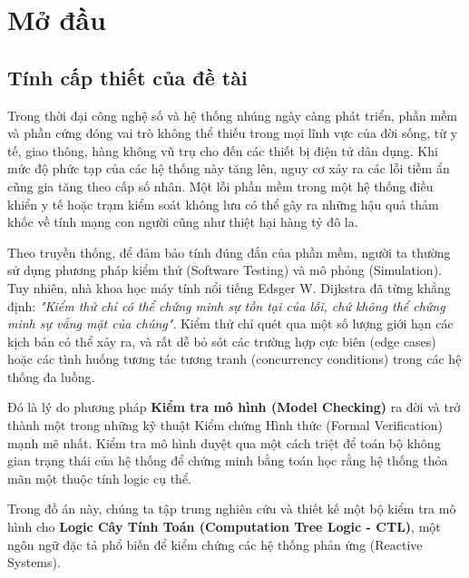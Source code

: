\documentclass[12pt,a4paper]{article}
\begin{document}

\newpage
\tableofcontents
\newpage
\listoffigures
\newpage
\listoftables
\newpage

\section{Mở đầu}
\subsection{Tính cấp thiết của đề tài}
Trong thời đại công nghệ số và hệ thống nhúng ngày càng phát triển, phần mềm và phần cứng đóng vai trò không thể thiếu trong mọi lĩnh vực của đời sống, từ y tế, giao thông, hàng không vũ trụ cho đến các thiết bị điện tử dân dụng. Khi mức độ phức tạp của các hệ thống này tăng lên, nguy cơ xảy ra các lỗi tiềm ẩn cũng gia tăng theo cấp số nhân. Một lỗi phần mềm trong một hệ thống điều khiển y tế hoặc trạm kiểm soát không lưu có thể gây ra những hậu quả thảm khốc về tính mạng con người cũng như thiệt hại hàng tỷ đô la.

Theo truyền thống, để đảm bảo tính đúng đắn của phần mềm, người ta thường sử dụng phương pháp kiểm thử (Software Testing) và mô phỏng (Simulation). Tuy nhiên, nhà khoa học máy tính nổi tiếng Edsger W. Dijkstra đã từng khẳng định: \textit{"Kiểm thử chỉ có thể chứng minh sự tồn tại của lỗi, chứ không thể chứng minh sự vắng mặt của chúng"}. Kiểm thử chỉ quét qua một số lượng giới hạn các kịch bản có thể xảy ra, và rất dễ bỏ sót các trường hợp cực biên (edge cases) hoặc các tình huống tương tác tương tranh (concurrency conditions) trong các hệ thống đa luồng.

Đó là lý do phương pháp \textbf{Kiểm tra mô hình (Model Checking)} ra đời và trở thành một trong những kỹ thuật Kiểm chứng Hình thức (Formal Verification) mạnh mẽ nhất. Kiểm tra mô hình duyệt qua một cách triệt để toán bộ không gian trạng thái của hệ thống để chứng minh bằng toán học rằng hệ thống thỏa mãn một thuộc tính logic cụ thể. 

Trong đồ án này, chúng ta tập trung nghiên cứu và thiết kế một bộ kiểm tra mô hình cho \textbf{Logic Cây Tính Toán (Computation Tree Logic - CTL)}, một ngôn ngữ đặc tả phổ biến để kiểm chứng các hệ thống phản ứng (Reactive Systems).
\end{document}
